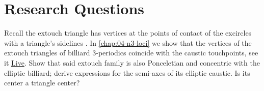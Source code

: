 \section{Research Questions}

\begin{question}
Recall the extouch triangle has vertices at the points of contact of the excircles with a triangle's sidelines \cite[Extouch triangle]{mw}. 
In \cref{chap:04-n3-loci} we show that the vertices of the extouch triangles of billiard 3-periodics coincide with the caustic touchpoints, see it 
\href{https://bit.ly/33PufRv}{Live}. Show that said extouch family is also Ponceletian and concentric with the elliptic billiard; derive expressions for the semi-axes of its elliptic caustic. Is its center a triangle center? 
\label{que:03-extouch}
\end{question}
